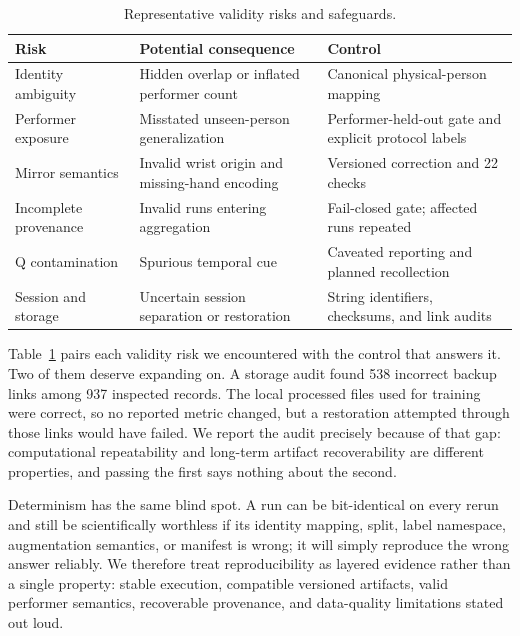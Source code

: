\begin{table}[htbp]
\centering
\caption{Representative validity risks and safeguards.}
\label{tab:reliability}
\small
\setlength{\tabcolsep}{3pt}
\renewcommand{\arraystretch}{1.08}

\begin{tabularx}{\linewidth}{
    >{\raggedright\arraybackslash}p{2.2cm}
    >{\raggedright\arraybackslash}X
    >{\raggedright\arraybackslash}X
}
\toprule
\textbf{Risk}
& \textbf{Potential consequence}
& \textbf{Control} \\
\midrule
Identity ambiguity
& Hidden overlap or inflated performer count
& Canonical physical-person mapping \\

Performer exposure
& Misstated unseen-person generalization
& Performer-held-out gate and explicit protocol labels \\

Mirror semantics
& Invalid wrist origin and missing-hand encoding
& Versioned correction and 22 checks \\

Incomplete provenance
& Invalid runs entering aggregation
& Fail-closed gate; affected runs repeated \\

Q contamination
& Spurious temporal cue
& Caveated reporting and planned recollection \\

Session and storage
& Uncertain session separation or restoration
& String identifiers, checksums, and link audits \\
\bottomrule
\end{tabularx}
\end{table}

Table~\ref{tab:reliability} pairs each validity risk we encountered with the control that answers it. Two of them deserve expanding on. A storage audit found 538 incorrect backup links among 937 inspected records. The local processed files used for training were correct, so no reported metric changed, but a restoration attempted through those links would have failed. We report the audit precisely because of that gap: computational repeatability and long-term artifact recoverability are different properties, and passing the first says nothing about the second.

Determinism has the same blind spot. A run can be bit-identical on every rerun and still be scientifically worthless if its identity mapping, split, label namespace, augmentation semantics, or manifest is wrong; it will simply reproduce the wrong answer reliably. We therefore treat reproducibility as layered evidence rather than a single property: stable execution, compatible versioned artifacts, valid performer semantics, recoverable provenance, and data-quality limitations stated out loud.

